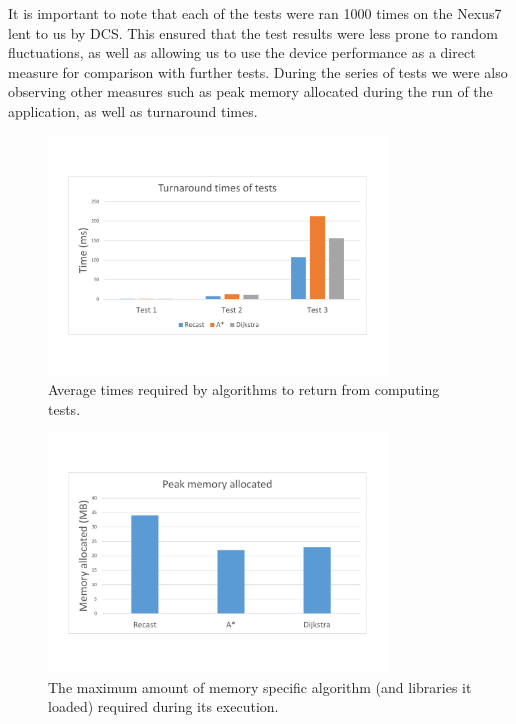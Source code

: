 \documentclass[12pt,a4paper]{report}
\begin{document}
It is important to note that each of the tests were ran 1000 times on the Nexus7 lent to us by DCS. This ensured that the test results were less prone to random fluctuations, as well as allowing us to use the device performance as a direct measure for comparison with further tests. During the series of tests we were also observing other measures such as peak memory allocated during the run of the application, as well as turnaround times.

\begin{figure}[]
\center
\includegraphics[trim=0 0 0 0, clip,width=0.8\textwidth,height=\textheight,keepaspectratio]{images/algoTurnaroundTimes.pdf}
\caption{Average times required by algorithms to return from computing tests.}
\label{fig:algoTurnaround}
\end{figure}

\begin{figure}[]
\center
\includegraphics[trim=0 0 0 0, clip,width=0.8\textwidth,height=\textheight,keepaspectratio]{images/algoMemoryAlloc.pdf}
\caption{The maximum amount of memory specific algorithm (and libraries it loaded) required during its execution.}
\label{fig:algoMemAlloc}
\end{figure}
\end{document}
